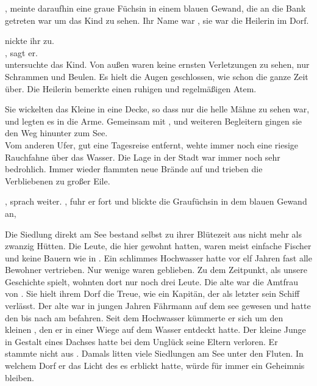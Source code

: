 \begin{Large}
, meinte daraufhin eine graue Füchsin in einem blauen Gewand, die an die Bank getreten war um das Kind zu sehen. Ihr Name war {\Salbana}, sie war die Heilerin im Dorf. 

{\Eno} nickte ihr zu.\\
, sagt er.\\
{\Salbana} untersuchte das Kind. Von außen waren keine ernsten Verletzungen zu sehen, nur Schrammen und Beulen. Es hielt die Augen geschlossen, wie schon die ganze Zeit über. Die Heilerin bemerkte einen ruhigen und regelmäßigen Atem.

Sie wickelten das Kleine in eine Decke, so dass nur die helle Mähne zu sehen war, und legten es {\Nox} in die Arme. Gemeinsam mit {\Salbana}, {\Eno} und weiteren Begleitern gingen sie den Weg hinunter zum See.\\
Vom anderen Ufer, gut eine Tagesreise entfernt, wehte immer noch eine riesige Rauchfahne über das Wasser. Die Lage in der Stadt {\Tern} war immer noch sehr bedrohlich. Immer wieder flammten neue Brände auf und trieben die Verbliebenen zu großer Eile.

, sprach {\Nox} weiter. , fuhr er fort und blickte die Graufüchsin in dem blauen Gewand an, 

Die Siedlung {\AltBerna} direkt am See bestand selbst zu ihrer Blütezeit aus nicht mehr als zwanzig Hütten. Die Leute, die hier gewohnt hatten, waren meist einfache Fischer und keine Bauern wie in {\Berna}. Ein schlimmes Hochwasser hatte vor elf Jahren fast alle Bewohner vertrieben. Nur wenige waren geblieben. Zu dem Zeitpunkt, als unsere Geschichte spielt, wohnten dort nur noch drei Leute. Die alte {\Tea} war die Amtfrau von {\AltBerna}. Sie hielt ihrem Dorf die Treue, wie ein Kapitän, der als letzter sein Schiff verlässt. Der alte {\Marn} war in jungen Jahren Fährmann auf dem {\Tern}see gewesen und hatte den {\Rhin} bis nach {\Toris} am {\Dreifluss} befahren. Seit dem Hochwasser kümmerte er sich um den kleinen {\Piedo}, den er in einer Wiege auf dem Wasser entdeckt hatte. Der kleine Junge in Gestalt eines Dachses hatte bei dem Unglück seine Eltern verloren. Er stammte nicht aus {\AltBerna}. Damals litten viele Siedlungen am See unter den Fluten. In welchem Dorf er das Licht des {\Enland}es erblickt hatte, würde für immer ein Geheimnis bleiben.


\end{Large}
